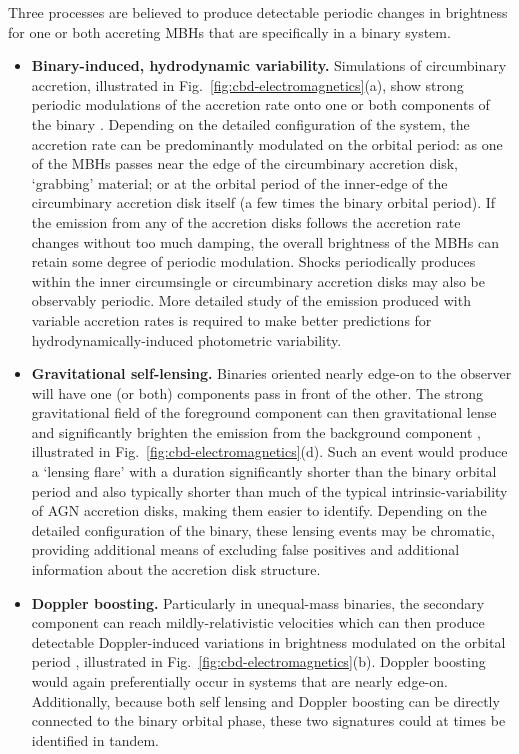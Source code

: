 \documentclass[onecolumn,authoryear]{els-mrw}
\begin{document}
Three processes are believed to produce detectable periodic changes in brightness for one or both accreting MBHs that are specifically in a binary system.
\begin{itemize}
\item \textbf{Binary-induced, hydrodynamic variability.}  Simulations of circumbinary accretion, illustrated in Fig.~\ref{fig:cbd-electromagnetics}(a), show strong periodic modulations of the accretion rate onto one or both components of the binary \citep{Farris+2014}.  Depending on the detailed configuration of the system, the accretion rate can be predominantly modulated on the orbital period: as one of the MBHs passes near the edge of the circumbinary accretion disk, `grabbing' material; or at the orbital period of the inner-edge of the circumbinary accretion disk itself (a few times the binary orbital period).  If the emission from any of the accretion disks follows the accretion rate changes without too much damping, the overall brightness of the MBHs can retain some degree of periodic modulation.  Shocks periodically produces within the inner circumsingle or circumbinary accretion disks may also be observably periodic.  More detailed study of the emission produced with variable accretion rates is required to make better predictions for hydrodynamically-induced photometric variability.
\item \textbf{Gravitational self-lensing.}  Binaries oriented nearly edge-on to the observer will have one (or both) components pass in front of the other.  The strong gravitational field of the foreground component can then gravitational lense and significantly brighten the emission from the background component \citep{D'Orazio+DiStefano-2018}, illustrated in Fig.~\ref{fig:cbd-electromagnetics}(d).  Such an event would produce a `lensing flare' with a duration significantly shorter than the binary orbital period and also typically shorter than much of the typical intrinsic-variability of AGN accretion disks, making them easier to identify.  Depending on the detailed configuration of the binary, these lensing events may be chromatic, providing additional means of excluding false positives and additional information about the accretion disk structure.
\item \textbf{Doppler boosting.}  Particularly in unequal-mass binaries, the secondary component can reach mildly-relativistic velocities which can then produce detectable Doppler-induced variations in brightness modulated on the orbital period \citep{D'Orazio+2015}, illustrated in Fig.~\ref{fig:cbd-electromagnetics}(b).  Doppler boosting would again preferentially occur in systems that are nearly edge-on.  Additionally, because both self lensing and Doppler boosting can be directly connected to the binary orbital phase, these two signatures could at times be identified in tandem.
\end{itemize}
\end{document}
